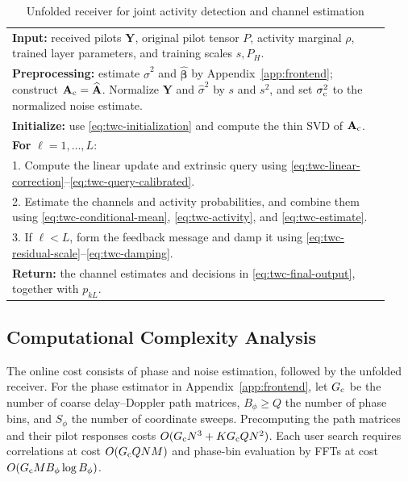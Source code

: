 \begin{table}[t]
\centering
\caption{Unfolded receiver for joint activity detection and channel estimation}
\label{tab:twc-algorithm}
\begin{tabular}{p{0.93\linewidth}}
\toprule
\textbf{Input:} received pilots $\mathbf Y$, original pilot tensor $P$,
activity marginal $\rho$, trained layer parameters, and training
scales $s,P_H$.\\
\textbf{Preprocessing:} estimate $\widehat\sigma^2$ and
$\widehat{\bm\beta}$ by Appendix~\ref{app:frontend}; construct
$\mathbf A_{\rm c}=\widehat{\mathbf A}$.
Normalize $\mathbf Y$ and $\widehat\sigma^2$ by $s$ and $s^2$,
and set $\sigma_{\rm c}^2$ to the normalized noise estimate.\\
\textbf{Initialize:} use \eqref{eq:twc-initialization} and compute
the thin SVD of $\mathbf A_{\rm c}$.\\
\textbf{For} $\ell=1,\ldots,L$:\\
1. Compute the linear update and extrinsic query using
\eqref{eq:twc-linear-correction}--\eqref{eq:twc-query-calibrated}.\\
2. Estimate the channels and activity probabilities, and combine
them using \eqref{eq:twc-conditional-mean}, \eqref{eq:twc-activity},
and \eqref{eq:twc-estimate}.\\
3. If $\ell<L$, form the feedback message and damp it using
\eqref{eq:twc-residual-scale}--\eqref{eq:twc-damping}.\\
\textbf{Return:} the channel estimates and decisions in
\eqref{eq:twc-final-output}, together with $p_{kL}$.\\
\bottomrule
\end{tabular}
\end{table}

\subsection{Computational Complexity Analysis}

The online cost consists of phase and noise estimation, followed by
the unfolded receiver. For the phase estimator in
Appendix~\ref{app:frontend}, let $G_{\rm c}$ be the number of coarse
delay--Doppler path matrices, $B_\phi\geq Q$ the number of phase bins,
and $S_\phi$ the number of coordinate sweeps. Precomputing the path
matrices and their pilot responses costs
$O(G_{\rm c}N^3+KG_{\rm c}QN^2)$.
Each user search requires correlations at cost $O(G_{\rm c}QNM)$
and phase-bin evaluation by FFTs at cost
$O(G_{\rm c}MB_\phi\log B_\phi)$.

